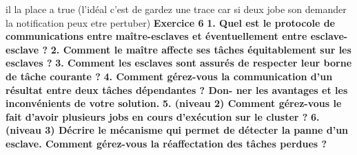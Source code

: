 \documentclass{article}
\begin{document}
il la place a true (l'idéal c'est de gardez une trace car si deux jobe son demander la notification peux etre pertuber)
\newline
\newline
\textbf{Exercice 6}
\newline
\textbf{1. Quel est le protocole de communications entre maître-esclaves et éventuellement entre
esclave-esclave ?}
\newline
\newline
\textbf{2. Comment le maître affecte ses tâches équitablement sur les esclaves ?}
\newline
\newline
\textbf{3. Comment les esclaves sont assurés de respecter leur borne de tâche courante ?}
\newline
\newline
\textbf{4. Comment gérez-vous la communication d’un résultat entre deux tâches dépendantes ? Don-
ner les avantages et les inconvénients de votre solution.}
\newline
\newline
\textbf{5. (niveau 2) Comment gérez-vous le fait d’avoir plusieurs jobs en cours d’exécution sur le
cluster ?}
\newline
\newline
\textbf{6. (niveau 3) Décrire le mécanisme qui permet de détecter la panne d’un esclave. Comment
gérez-vous la réaffectation des tâches perdues ?}
\end{document}
